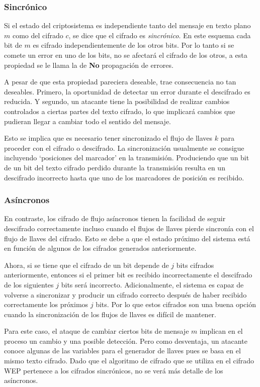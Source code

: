 \subsubsection{Sincrónico}
Si el estado del criptosistema es independiente tanto del mensaje en texto plano $m$ como del cifrado $c$, se dice que el cifrado es \emph{sincrónico}. En este esquema cada bit de $m$ es cifrado independientemente de los otros bits. Por lo tanto si se comete un error en uno de los bits, no se afectará el cifrado de los otros, a esta propiedad se le llama la de {\bf No} propagación de errores. 

A pesar de que esta propiedad pareciera deseable, trae consecuencia no tan deseables. Primero, la oportunidad de detectar un error durante el descifrado es reducida.  Y segundo, un atacante tiene la posibilidad de realizar cambios controlados a ciertas partes del texto cifrado, lo que implicará cambios que pudieran llegar a cambiar todo el sentido del mensaje.

Esto se implica que es necesario tener sincronizado el flujo de llaves $k$ para proceder con el cifrado o descifrado. La sincronización usualmente se consigue incluyendo `posiciones del marcador' en la transmisión. Produciendo que un bit de un bit del texto cifrado perdido durante la transmisión resulta en un descifrado incorrecto hasta que uno de los marcadores de posición es recibido.
\subsubsection{Asíncronos}
En contraste, los cifrado de flujo asíncronos tienen la facilidad de seguir descifrado correctamente incluso cuando el flujos de llaves pierde sincronía con el flujo de llaves del cifrado. Esto se debe a que el estado próximo del sistema está en función de algunos de los cifrados generados anteriormente.

Ahora, si se tiene que el cifrado de un bit depende de $j$ bits cifrados anteriormente, entonces si el primer bit es recibido incorrectamente el descifrado de los siguientes $j$ bits será incorrecto. Adicionalmente, el sistema es capaz de volverse a sincronizar y producir un cifrado correcto después de haber recibido correctamente los próximos $j$ bits. Por lo que estos cifrados son una buena opción cuando la sincronización de los flujos de llaves es difícil de mantener.

Para este caso, el ataque de cambiar ciertos bits de mensaje $m$ implican en el proceso un cambio y una posible detección. Pero como desventaja, un atacante conoce algunas de las variables para el generador de llaves pues se basa en el mismo texto cifrado. Dado que el algoritmo de cifrado que se utiliza en el cifrado WEP pertenece a los cifrados sincrónicos, no se verá más detalle de los asíncronos.
